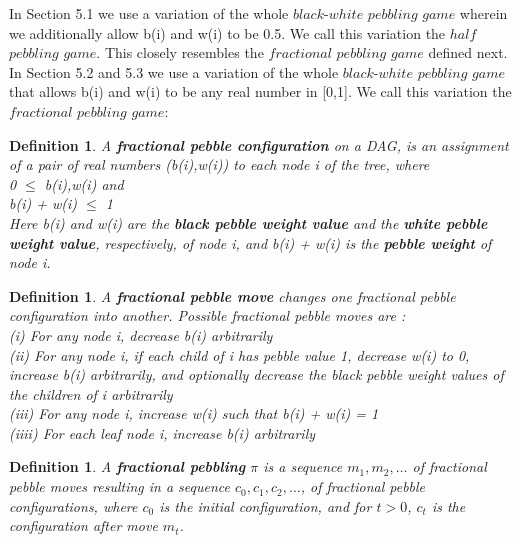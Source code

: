 \documentclass[12pt]{article}
\newtheorem{definition}[theorem]{Definition}
\begin{document}
In Section 5.1 we use a variation of the whole $black$-$white$ $pebbling$ $game$ wherein we additionally allow b(i) and w(i) to be 0.5. We call this variation the $half$ $pebbling$ $game$. This closely resembles the $fractional $ $pebbling$ $game$ defined next.\\

In Section 5.2 and 5.3 we use a variation of the whole $black$-$white$ $pebbling$ $game$ that allows b(i) and w(i) to be any real number in [0,1]. We call this variation the $fractional$ $pebbling$ $game$:

\begin{definition}

A {\bf fractional pebble configuration} on a DAG, is an
assignment of a pair of real numbers (b(i),w(i)) to each node i of the tree, where\\
0 $\leq$ b(i),w(i) and\\
b(i) + w(i) $\leq$ 1\\
Here b(i) and w(i) are the {\bf  black pebble weight value} and the {\bf white pebble weight value}, respectively, of node i,
and b(i) + w(i) is the {\bf pebble weight} of node i.
\end{definition}

\begin{definition}
\noindent
A {\bf fractional pebble move} changes one fractional pebble configuration into another. Possible fractional pebble moves are :\\
(i) For any node i, decrease b(i) arbitrarily\\
(ii) For any node i, if each child of i has pebble value 1, decrease w(i) to 0, increase b(i) arbitrarily, and optionally decrease the black pebble weight values of the children of i arbitrarily\\
(iii) For any node i, increase w(i) such that b(i) + w(i) = 1\\
(iiii) For each leaf node i, increase b(i) arbitrarily 
\end{definition}

\begin{definition}
\noindent
A {\bf fractional pebbling} $\pi$ is a sequence $m_1,m_2,\ldots$
of fractional pebble moves resulting in a sequence $c_0,c_1,c_2,\ldots$,
of fractional pebble configurations, where $c_0$ is the initial configuration,
and for $t>0$, $c_t$ is the configuration after move $m_t$.\\
\end{definition}
\end{document}
